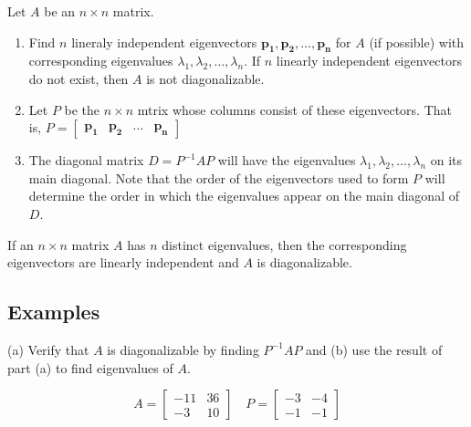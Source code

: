 \documentclass{report}
\begin{document}
\begin{tcolorbox}[title = Steps for Diagonalizing a Square Matrix]
	Let $A$ be an $n \times n$ matrix.
	
	\begin{enumerate}
			\item Find $n$ lineraly independent eigenvectors $\bm{p_1}, \bm{p_2}, \hdots, \bm{p_n}$ for $A$ (if possible) with corresponding eigenvalues $\lambda_1, \lambda_2, \hdots, \lambda_n$. If $n$ linearly independent eigenvectors do not exist, then $A$ is not diagonalizable.
			
			\item Let $P$ be the $n \times n$ mtrix whose columns consist of these eigenvectors. That is, $P = \begin{bmatrix} \bm{p_1} & \bm{p_2} & \hdots & \bm{p_n} \end{bmatrix}$
			
			\item The diagonal matrix $D = P^{-1} AP $ will have the eigenvalues $\lambda_1, \lambda_2, \hdots, \lambda_n$ on its main diagonal. Note that the order of the eigenvectors used to form $P$ will determine the order in which the eigenvalues appear on the main diagonal of $D$. 
	\end{enumerate}
\end{tcolorbox}

\begin{tcolorbox}[title = Sufficient Condition for Diagonalization]
	If an $n \times n$ matrix $A$ has $n$ distinct eigenvalues, then the corresponding eigenvectors are linearly independent and $A$ is diagonalizable. 
\end{tcolorbox}

\subsection{Examples}

\begin{tcolorbox}[colframe = lightred]
	(a) Verify that $A$ is diagonalizable by finding $P^{-1} AP$ and (b) use the result of part (a) to find eigenvalues of $A$. 
	
	$$
	A = \begin{bmatrix} -11 & 36 \\ -3 & 10 \end{bmatrix} \quad P = \begin{bmatrix} -3 & -4 \\ -1 & -1 \end{bmatrix} 
	$$
\end{tcolorbox}
\end{document}
